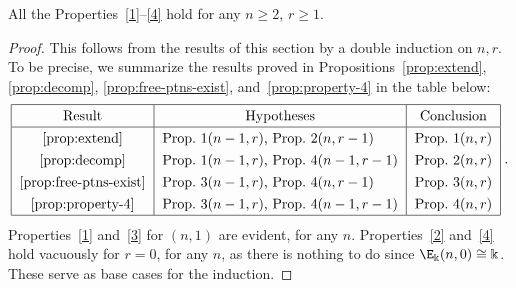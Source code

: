 \begin{theo}\label{thm:properties}
 All the Properties~\ref{1}--\ref{4} hold for any $n \ge 2$, $r\ge
 1$.
\end{theo}

\begin{proof}
This follows from the results of this section by a double induction on
$n,r$. To be precise, we summarize the results proved in Propositions~\ref{prop:extend}, \ref{prop:decomp}, \ref{prop:free-ptns-exist}, and~\ref{prop:property-4} in the table below:
\[
\renewcommand{\arraystretch}{1.3}
\begin{tabular}{|c|l|c|}
\hline
 Result & \multicolumn{1}{c|}{Hypotheses} & Conclusion \\ \hline
\ref{prop:extend}& Prop.~1$(n-1,r)$, Prop.~2$(n,r-1)$ & Prop.~1$(n,r)$ \\
\ref{prop:decomp}& Prop.~1$(n-1,r)$, Prop.~4$(n-1,r-1)$ & Prop.~2$(n,r)$ \\
\ref{prop:free-ptns-exist}& Prop.~3$(n-1,r)$, Prop.~4$(n,r-1)$ & Prop.~3$(n,r)$ \\
\ref{prop:property-4}& Prop.~3$(n-1,r)$, Prop.~4$(n-1,r-1)$ & Prop.~4$(n,r)$\\ \hline
\end{tabular}\; .
\]
Properties~\ref{1} and~\ref{3} for $(n,1)$ are evident, for any
$n$. Properties~\ref{2} and~\ref{4} hold vacuously for $r=0$, for any
$n$, as there is nothing to do since $\E_\Bbbk(n,0) \cong
\Bbbk$. These serve as base cases for the induction.
\end{proof}
